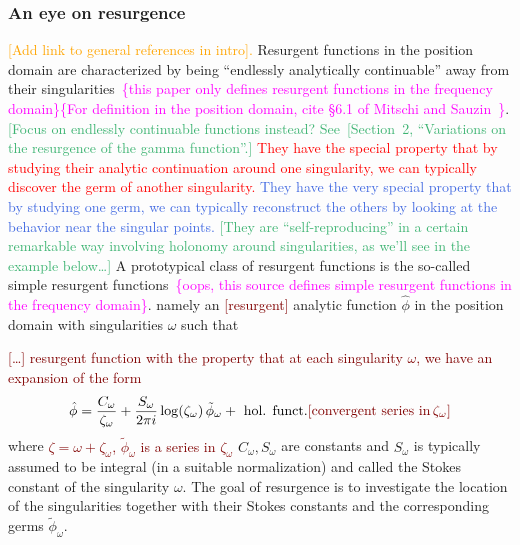 \documentclass{article}
\newcommand{\series}[1]{\tilde{#1}}
\theoremstyle{definition}
\theoremstyle{plain}
\begin{document}
{\subsubsection{An eye on resurgence}\label{apx:eye-res-airy}
\textcolor{orange}{[Add link to general references in intro].} Resurgent functions in the position domain are characterized by being ``endlessly analytically continuable'' away from their singularities~\textcolor{magenta}{\cite[Section~1.2.2]{intro-to-ecalle}\{this paper only defines resurgent functions in the frequency domain\}\{For definition in the position domain, cite \S 6.1 of Mitschi and Sauzin~\cite{diverg-resurg-i}\}}. \textcolor{MediumSeaGreen}{[Focus on endlessly continuable functions instead? See~[Section~2, ``Variations on the resurgence of the gamma function''.]} \textcolor{red}{They have the special property that by studying their analytic continuation around one singularity, we can typically discover the germ of another singularity.} \textcolor{RoyalBlue}{They have the very special property that by studying one germ, we can typically reconstruct the others by looking at the behavior near the singular points.} \textcolor{MediumSeaGreen}{[They are ``self-reproducing'' in a certain remarkable way involving holonomy around singularities, as we'll see in the example below\ldots]} A prototypical class of resurgent functions is the so-called simple resurgent functions~\textcolor{magenta}{\cite[Section~1.2.3]{intro-to-ecalle}\{oops, this source defines simple resurgent functions in the frequency domain\}}.  namely an \textcolor{Maroon}{[resurgent]} analytic function $\hat{\phi}$ in the position domain with singularities $\omega$ such that

\textcolor{Maroon}{[\ldots] resurgent function with the property that at each singularity $\omega$, we have an expansion of the form}
\begin{align*}
    \hat{\phi} = \frac{C_\omega}{\zeta_\omega}+\frac{S_\omega}{2\pi i} \log(\zeta_\omega)\,\series{\phi}_\omega + \text{ hol. funct.} \textcolor{Maroon}{[\text{convergent series in}\,\zeta_\omega]}
\end{align*}
where \textcolor{Maroon}{$\zeta = \omega + \zeta_\omega$, $\series{\phi}_\omega$ is a series in $\zeta_\omega$} $C_\omega, S_\omega$ are constants and $S_\omega$ is typically assumed to be integral (in a suitable normalization) and called the Stokes constant of the singularity $\omega$. The goal of resurgence is to investigate the location of the singularities together with their Stokes constants and the corresponding germs $\series{\phi}_\omega$.  

}
\end{document}
